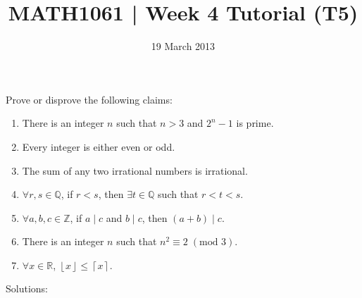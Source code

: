 \documentclass[a4paper,12pt]{article}
\newcommand{\floor}[1]{\left\lfloor #1 \right\rfloor}
\newcommand{\ceil}[1]{\left\lceil #1 \right\rceil}
\begin{document}
\pagestyle{myheadings}

\title{MATH1061 | Week 4 Tutorial (T5)}
\date{19 March 2013}
\maketitle

Prove or disprove the following claims:

\begin{enumerate}
\item There is an integer $n$ such that $n > 3$ and $2^n - 1$ is prime.
\item Every integer is either even or odd.
\item The sum of any two irrational numbers is irrational.
\item $\forall r, s \in \mathbb{Q}$, if $r < s$, then $\exists t \in \mathbb{Q}$ such that $r < t < s$.
\item $\forall a, b, c \in \mathbb{Z}$, if $a \mid c$ and $b \mid c$, then $(a + b) \mid c$.
\item There is an integer $n$ such that $n^2 \equiv 2 \; (\text{mod } 3)$.
\item $\forall x \in \mathbb{R}$, $\floor{x} \leq \ceil{x}$.
\end{enumerate}

\newpage

Solutions:
\end{document}
